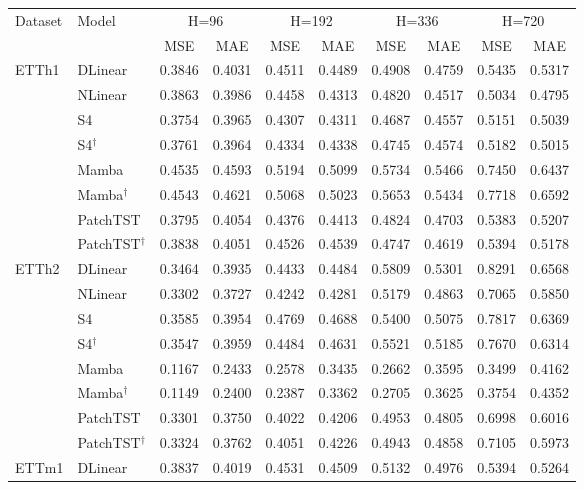 \scriptsize
\setlength{\tabcolsep}{4pt}
\begin{tabular}{llcccccccc}
\toprule
Dataset & Model & \multicolumn{2}{c}{H=96} & \multicolumn{2}{c}{H=192} & \multicolumn{2}{c}{H=336} & \multicolumn{2}{c}{H=720} \\
 & & MSE & MAE & MSE & MAE & MSE & MAE & MSE & MAE \\
\midrule
\multirow{8}{*}{ETTh1} & DLinear & 0.3846 & 0.4031 & 0.4511 & 0.4489 & 0.4908 & 0.4759 & 0.5435 & 0.5317 \\
 & NLinear & 0.3863 & 0.3986 & 0.4458 & 0.4313 & 0.4820 & 0.4517 & 0.5034 & 0.4795 \\
 & S4 & 0.3754 & 0.3965 & 0.4307 & 0.4311 & 0.4687 & 0.4557 & 0.5151 & 0.5039 \\
 & S4$^\dagger$ & 0.3761 & 0.3964 & 0.4334 & 0.4338 & 0.4745 & 0.4574 & 0.5182 & 0.5015 \\
 & Mamba & 0.4535 & 0.4593 & 0.5194 & 0.5099 & 0.5734 & 0.5466 & 0.7450 & 0.6437 \\
 & Mamba$^\dagger$ & 0.4543 & 0.4621 & 0.5068 & 0.5023 & 0.5653 & 0.5434 & 0.7718 & 0.6592 \\
 & PatchTST & 0.3795 & 0.4054 & 0.4376 & 0.4413 & 0.4824 & 0.4703 & 0.5383 & 0.5207 \\
 & PatchTST$^\dagger$ & 0.3838 & 0.4051 & 0.4526 & 0.4539 & 0.4747 & 0.4619 & 0.5394 & 0.5178 \\
\midrule
\multirow{8}{*}{ETTh2} & DLinear & 0.3464 & 0.3935 & 0.4433 & 0.4484 & 0.5809 & 0.5301 & 0.8291 & 0.6568 \\
 & NLinear & 0.3302 & 0.3727 & 0.4242 & 0.4281 & 0.5179 & 0.4863 & 0.7065 & 0.5850 \\
 & S4 & 0.3585 & 0.3954 & 0.4769 & 0.4688 & 0.5400 & 0.5075 & 0.7817 & 0.6369 \\
 & S4$^\dagger$ & 0.3547 & 0.3959 & 0.4484 & 0.4631 & 0.5521 & 0.5185 & 0.7670 & 0.6314 \\
 & Mamba & 0.1167 & 0.2433 & 0.2578 & 0.3435 & 0.2662 & 0.3595 & 0.3499 & 0.4162 \\
 & Mamba$^\dagger$ & 0.1149 & 0.2400 & 0.2387 & 0.3362 & 0.2705 & 0.3625 & 0.3754 & 0.4352 \\
 & PatchTST & 0.3301 & 0.3750 & 0.4022 & 0.4206 & 0.4953 & 0.4805 & 0.6998 & 0.6016 \\
 & PatchTST$^\dagger$ & 0.3324 & 0.3762 & 0.4051 & 0.4226 & 0.4943 & 0.4858 & 0.7105 & 0.5973 \\
\midrule
\multirow{8}{*}{ETTm1} & DLinear & 0.3837 & 0.4019 & 0.4531 & 0.4509 & 0.5132 & 0.4976 & 0.5394 & 0.5264 \\

\end{tabular}
